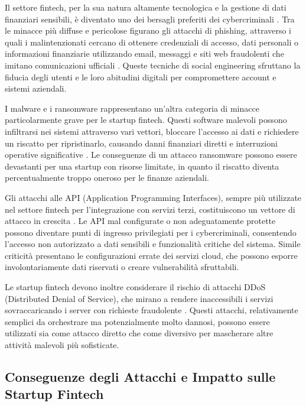 \documentclass[a4paper,12pt]{report}
\begin{document}
Il settore fintech, per la sua natura altamente tecnologica e la gestione di dati finanziari sensibili, è diventato uno dei bersagli preferiti dei cybercriminali \cite{cyberThreatsFintech}. Tra le minacce più diffuse e pericolose figurano gli attacchi di phishing, attraverso i quali i malintenzionati cercano di ottenere credenziali di accesso, dati personali o informazioni finanziarie utilizzando email, messaggi e siti web fraudolenti che imitano comunicazioni ufficiali \cite{cyberThreatsFintech}. Queste tecniche di social engineering sfruttano la fiducia degli utenti e le loro abitudini digitali per compromettere account e sistemi aziendali.

I malware e i ransomware rappresentano un’altra categoria di minacce particolarmente grave per le startup fintech. Questi software malevoli possono infiltrarsi nei sistemi attraverso vari vettori, bloccare l’accesso ai dati e richiedere un riscatto per ripristinarlo, causando danni finanziari diretti e interruzioni operative significative \cite{cyberThreatsFintech}. Le conseguenze di un attacco ransomware possono essere devastanti per una startup con risorse limitate, in quanto il riscatto diventa percentualmente troppo oneroso per le finanze aziendali.

Gli attacchi alle API (Application Programming Interfaces), sempre più utilizzate nel settore fintech per l’integrazione con servizi terzi, costituiscono un vettore di attacco in crescita \cite{fintechChallenges}. Le API mal configurate o non adeguatamente protette possono diventare punti di ingresso privilegiati per i cybercriminali, consentendo l’accesso non autorizzato a dati sensibili e funzionalità critiche del sistema. Simile criticità presentano le configurazioni errate dei servizi cloud, che possono esporre involontariamente dati riservati o creare vulnerabilità sfruttabili.

Le startup fintech devono inoltre considerare il rischio di attacchi DDoS (Distributed Denial of Service), che mirano a rendere inaccessibili i servizi sovraccaricando i server con richieste fraudolente \cite{fintechChallenges}. Questi attacchi, relativamente semplici da orchestrare ma potenzialmente molto dannosi, possono essere utilizzati sia come attacco diretto che come diversivo per mascherare altre attività malevoli più sofisticate.

\subsection{Conseguenze degli Attacchi e Impatto sulle Startup Fintech}
\end{document}

